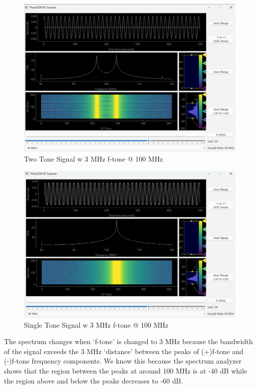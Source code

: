 \documentclass[
	letterpaper, %
	10pt, %
]{CSUniSchoolLabReport}
\begin{document}
\begin{figure}[H] %
	\centering %
	\includegraphics[width=1.2\textwidth]{assignment2c1.png} %
	\caption{Two Tone Signal w 3 MHz f-tone @ 100 MHz}
	\label{fig:block}
\end{figure}

\begin{figure}[H] %
	\centering %
	\includegraphics[width=1.2\textwidth]{assignment2c2.png} %
	\caption{Single Tone Signal w 3 MHz f-tone @ 100 MHz}
	\label{fig:block}
\end{figure}

The spectrum changes when ‘f-tone’ is changed to 3 MHz because the bandwidth of the signal exceeds the 3 MHz ‘distance’ between the peaks of (+)f-tone and (-)f-tone frequency components. We know this because the spectrum analyzer shows that the region between the peaks at around 100 MHz is at -40 dB while the region above and below the peaks decreases to -60 dB.
\end{document}
